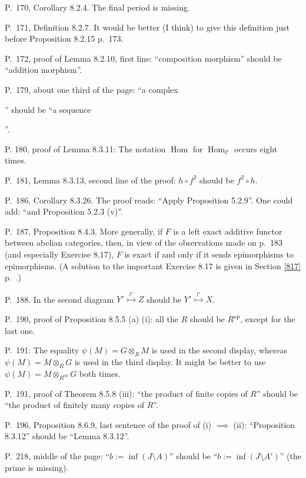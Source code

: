 \documentclass[12pt]{article}
\theoremstyle{remark}%
\newcommand{\n}{\noindent}
\newcommand{\C}{\mathcal C}
\newcommand{\m}{\rightarrowtail}
\DeclareMathOperator{\h}{Hom}
\DeclareMathOperator{\op}{op}
\begin{document}
\n P.~170, Corollary 8.2.4. The final period is missing. 

\n P.~171, Definition 8.2.7. It would be better (I think) to give this definition just before Proposition 8.2.15 p.~173. 

\n P.~172, proof of Lemma 8.2.10, first line: ``composition morphism'' should be ``addition morphism''. 

\n P.~179, about one third of the page: ``a complex 
'' 
should be ``a sequence 
''. 

\n P. 180, proof of Lemma 8.3.11: The notation $\h$ for $\h_\C$ occurs eight times. 

\n P.~181, Lemma 8.3.13, second line of the proof: $h\circ f^2$ should be $f^2\circ h$. 

\n P.~186, Corollary 8.3.26. The proof reads: ``Apply Proposition 5.2.9''. One could add: ``and Proposition 5.2.3 (v)''. 

\n P.~187, Proposition 8.4.3. More generally, if $F$ is a left exact additive functor between abelian categories, then, in view of the observations made on p.~183 (and especially Exercise 8.17), $F$ is exact if and only if it sends epimorphisms to epimorphisms. (A solution to the important Exercise 8.17 is given in Section \ref{817} p.~\pageref{817}.) 

\n P.~188. In the second diagram $Y'\overset{l'}{\m}Z$ should be $Y'\overset{l'}{\m}X$. 

\n P.~190, proof of Proposition 8.5.5 (a) (i): all the $R$ should be $R^{\op}$, except for the last one.

\n P.~191: The equality $\psi(M)=G\otimes_RM$ is used in the second display, whereas $\psi(M)=M\otimes_RG$ is used in the third display. It might be better to use $\psi(M)=M\otimes_{R^{\op}}G$ both times.

\n P.~191, proof of Theorem 8.5.8 (iii): ``the product of finite copies of $R$'' should be ``the product of finitely many copies of $R$''.

\n P.~196, Proposition 8.6.9, last sentence of the proof of (i) $\implies$ (ii): ``Proposition 8.3.12'' should be ``Lemma 8.3.12''.

\n P.~218, middle of the page: ``$b:=\inf(J\setminus A)$'' should be ``$b:=\inf(J\setminus A')$'' (the prime is missing).
\end{document}
